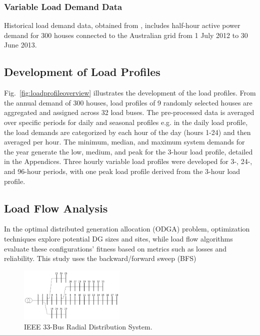 \documentclass[conference]{IEEEtran}
\begin{document}

\subsubsection{Variable Load Demand Data}
Historical load demand data, obtained from \cite{Ausgrid_solar_2023}, includes half-hour active power demand for 300 houses connected to the Australian grid from 1 July 2012 to 30 June 2013.

\subsection{Development of Load Profiles}
Fig.~\ref{fig:loadprofileoverview} illustrates the development of the load profiles. From the annual demand of 300 houses, load profiles of 9 randomly selected houses are aggregated and assigned across 32 load buses. The pre-processed data is averaged over specific periods for daily and seasonal profiles e.g. in the daily load profile, the load demands are categorized by each hour of the day (hours 1-24) and then averaged per hour. The minimum, median, and maximum system demands for the year generate the low, medium, and peak for the 3-hour load profile, detailed in the Appendices. Three hourly variable load profiles were developed for 3-, 24-, and 96-hour periods, with one peak load profile derived from the 3-hour load profile.





\subsection{Load Flow Analysis}
In the optimal distributed generation allocation (ODGA) problem, optimization techniques explore potential DG sizes and sites, while load flow algorithms evaluate these configurations' fitness based on metrics such as losses and reliability. This study uses the backward/forward sweep (BFS) 

\begin{figure}[htbp]
	\centerline{\includegraphics[width=0.45\textwidth]{33bus.png}}
	\caption{IEEE 33-Bus Radial Distribution System.}
	\vspace{-5pt}
	\label{fig:33bus}
\end{figure}
\end{document}
